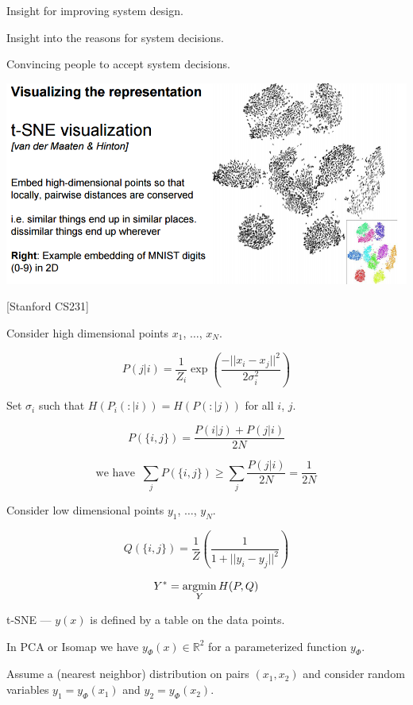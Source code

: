 {Insight for improving system design.

  \vfill
Insight into the reasons for system decisions.

  \vfill
Convincing people to accept system decisions.


\centerline{\includegraphics[width = 9.5in]{../images/t-SNE}}
\centerline{[Stanford CS231]}


Consider high dimensional points $x_1$, $\ldots$, $x_N$.

\vfill
$$P(j|i) = \frac{1}{Z_i} \exp\left(\frac{-||x_i -x_j||^2}{2\sigma_i^2}\right)$$

\vfill
Set $\sigma_i$ such that $H(P_i(:|i)) = H(P(:|j))$ for all $i$, $j$.

\vfill
$$P(\{i,j\}) = \frac{P(i|j) +P(j|i)}{2N}$$

\vfill
$$\mbox{we have}\;\; \sum_j P(\{i,j\}) \geq \sum_j \frac{P(j|i)}{2N} = \frac{1}{2N}$$


Consider low dimensional points $y_1$, $\ldots$, $y_N$.

\vfill
$$Q(\{i,j\}) = \frac{1}{Z} \left(\frac{1}{1 + ||y_i -y_j||^2}\right)$$

\vfill
$$Y^* = \operatorname*{argmin}_Y H(P,Q)$$


t-SNE --- $y(x)$ is defined by a table on the data points.

\vfill
In PCA or Isomap we have $y_\Phi(x) \in \mathbb{R}^2$ for a parameterized function $y_\Phi$.

\vfill
Assume a (nearest neighbor) distribution on pairs $(x_1,x_2)$ and consider random variables $y_1 = y_\Phi(x_1)$ and $y_2 = y_\Phi(x_2)$.

}

